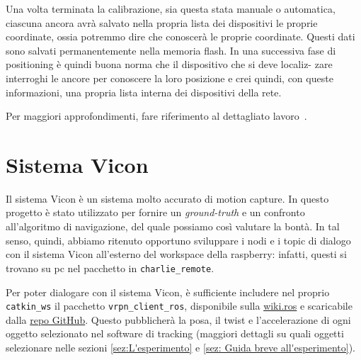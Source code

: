 Una volta terminata la calibrazione, sia questa stata manuale o automatica, ciascuna ancora avrà
salvato nella propria lista dei dispositivi le proprie coordinate, ossia potremmo dire che conoscerà le proprie coordinate. 
Questi dati sono salvati permanentemente nella memoria flash.
In una successiva fase di positioning è quindi buona norma che il dispositivo che si deve localiz-
zare interroghi le ancore per conoscere la loro posizione e crei quindi, con queste informazioni, una propria lista interna dei
dispositivi della rete.


Per maggiori approfondimenti, fare riferimento al dettagliato lavoro~\cite{ctesconistudio}.

\section{Sistema Vicon}
\label{sez:Sistema Vicon}

Il sistema Vicon è un sistema molto accurato di motion capture. 
In questo progetto è stato utilizzato per fornire un \textit{ground-truth} e un confronto all'algoritmo di navigazione, del quale possiamo così valutare la bontà. 
In tal senso, quindi, abbiamo ritenuto opportuno sviluppare i nodi e i topic di dialogo con il sistema Vicon all'esterno del workspace della raspberry: infatti, 
questi si trovano su pc nel pacchetto in \texttt{charlie\_remote}.

Per poter dialogare con il sistema Vicon, è sufficiente includere nel proprio \texttt{catkin\_ws} il pacchetto \texttt{vrpn\_client\_ros}, disponibile sulla 
\href{https://wiki.ros.org/vrpn_client_ros}{wiki.ros} e scaricabile dalla \href{https://github.com/ros-drivers/vrpn_client_ros}{repo GitHub}.
Questo pubblicherà la posa, il twist e l'accelerazione di ogni oggetto selezionato nel software di tracking (maggiori dettagli su quali oggetti selezionare 
nelle sezioni \ref{sez:L'esperimento} e \ref{sez: Guida breve all'esperimento}).

